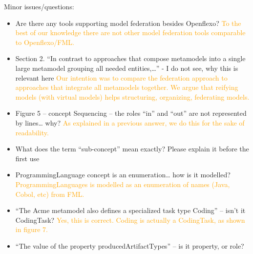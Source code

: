 \documentclass[10pt]{article}
\begin{document}
\begin{response}{Minor issues/questions: 
\begin{itemize}
    \item Are there any tools supporting model federation besides Openflexo? \textcolor{orange}{To the best of our knowledge there are not other model federation tools comparable to Openflexo/FML.}
    \item Section 2. “In contrast to approaches that compose metamodels into a single large metamodel grouping all needed entities,…” - I do not see, why this is relevant here \textcolor{orange}{Our intention was to compare the federation approach to approaches that integrate all metamodels together. We argue that reifying models (with virtual models) helps structuring, organizing, federating models.}
    \item Figure 5 – concept Sequencing – the roles “in” and “out” are not represented by lines… why? \textcolor{orange}{As explained in a previous answer, we do this for the sake of readability.}
    \item What does the term “sub-concept” mean exactly? Please explain it before the first use 
    \item ProgrammingLanguage concept is an enumeration… how is it modelled? \textcolor{orange}{ProgrammingLanguages is modelled as an enumeration of names (Java, Cobol, etc) from FML. }
    \item “The Acme metamodel also defines a specialized task type Coding” – isn’t it CodingTask? \textcolor{orange}{Yes, this is correct. Coding is actually a CodingTask, as shown in figure 7.}
    \item “The value of the property producedArtifactTypes” – is it property, or role? 
\end{itemize}}







\end{response}
\end{document}
